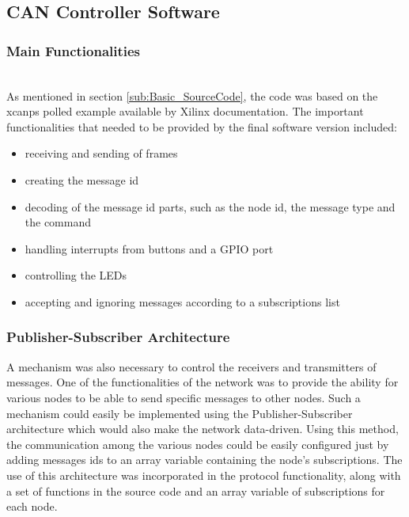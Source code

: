 

\subsection{CAN Controller Software}
\subsubsection{Main Functionalities}~\\
As mentioned in section \ref{sub:Basic_SourceCode}, the code was based on the xcanps polled example available by Xilinx documentation.
The important functionalities that needed to be provided by the final software version included:
\begin{itemize}
\item receiving and sending of frames
\item creating the message id
\item decoding of the message id parts, such as the node id, the message type and the command
\item handling interrupts from buttons and a GPIO port
\item controlling the LEDs
\item accepting and ignoring messages according to a subscriptions list
\end{itemize}

\subsubsection{Publisher-Subscriber Architecture}
A mechanism was also necessary to control the receivers and transmitters of messages.
One of the functionalities of the network was to provide the ability for various nodes to be able to send specific messages to other nodes.
Such a mechanism could easily be implemented using the Publisher-Subscriber architecture which would also make the network data-driven.
Using this method, the communication among the various nodes could be easily configured just by adding messages ids to an array variable containing the node's subscriptions.
The use of this architecture was incorporated in the protocol functionality, along with a set of functions in the source code and an array variable of subscriptions for each node.

